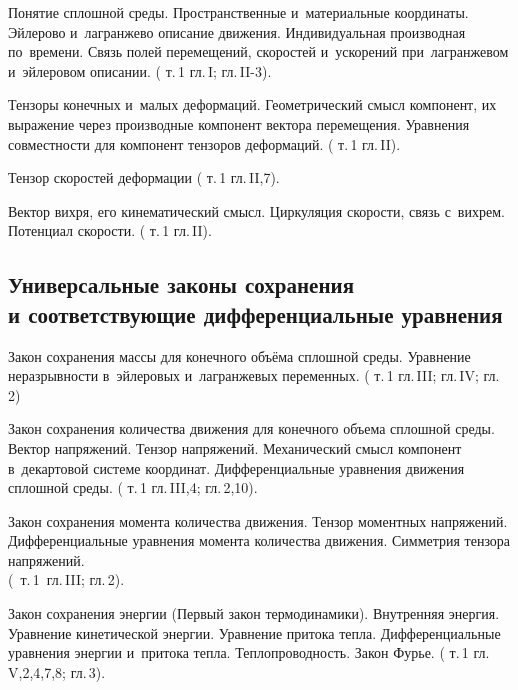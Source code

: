 \documentclass[a4paper,11pt]{article}
\def\tm#1{т.\,#1}
\def\g#1{гл.\,#1}
\def\gp#1#2{гл.\,#1\;\textsection#2}
\begin{document}
\begin{nums}{-2}

\item Понятие сплошной среды. Пространственные и~материальные координаты.
Эйлерово и~лагранжево описание движения. Индивидуальная производная по~времени.
Связь полей перемещений, скоростей и~ускорений при~лагранжевом и~эйлеровом описании.
(\cite{1} \tm{1} \g{I}; \gp{II}{1-3}).

\item Тензоры конечных и~малых деформаций. Геометрический смысл компонент, их выражение
через производные компонент вектора перемещения. Уравнения совместности
для компонент тензоров деформаций. (\cite{1} \tm{1} \gp{II}{5}).

\item Тензор скоростей деформации (\cite{1} \tm{1} \gp{II}{6,7}).

\item Вектор вихря, его кинематический смысл. Циркуляция скорости, связь с~вихрем.
Потенциал скорости. (\cite{1} \tm{1} \gp{II}{7}).

\subsection*{Универсальные законы сохранения\\и соответствующие дифференциальные уравнения}

\item Закон сохранения массы для конечного объёма сплошной среды. Уравнение неразрывности
в~эйлеровых и~лагранжевых переменных. (\cite{1} \tm{1} \gp{III}{1}; \gp{IV}{4}; \cite{2} \gp{2}{8})

\item Закон сохранения количества движения для конечного объема сплошной
среды. Вектор напряжений. Тензор напряжений. Механический смысл
компонент в~декартовой системе координат. Дифференциальные уравнения движения
сплошной среды. (\cite{1} \tm{1} \gp{III}{2,4}; \cite{2} \gp{2}{9,10}).

\item Закон сохранения момента количества движения. Тензор моментных напряжений.
Дифференциальные уравнения момента количества движения. Симметрия тензора напряжений.\\
(\cite{1}~\tm{1}~\gp{III}{3}; \cite{2} \gp{2}{12}).

\item Закон сохранения энергии (Первый закон термодинамики). Внутренняя энергия.
Уравнение кинетической энергии. Уравнение притока тепла. Дифференциальные уравнения
энергии и~притока тепла. Теплопроводность. Закон Фурье.
(\cite{1} \tm{1} \gp{V}{1,2,4,7,8}; \cite{2} \gp{3}{14}).


\end{nums}
\end{document}
